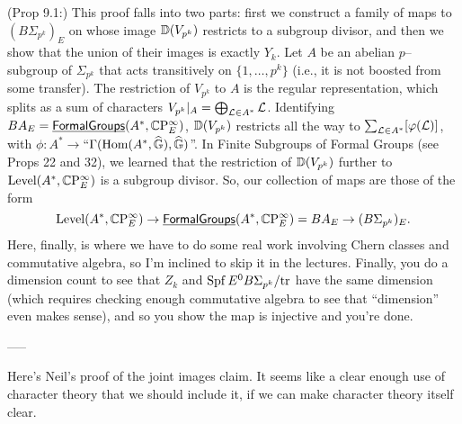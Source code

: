 (Prop 9.1:) This proof falls into two parts: first we construct a family of maps to $(B\Sigma_{p^k})_E$ on whose image $\mathbb D(V_{p^k})$ restricts to a subgroup divisor, and then we show that the union of their images is exactly $Y_k$.  Let $A$ be an abelian $p$--subgroup of $\Sigma_{p^k}$ that acts transitively on $\{1, \ldots, p^k\}$ (i.e., it is not boosted from some transfer).  The restriction of $V_{p^k}$ to $A$ is the regular representation, which splits as a sum of characters $V_{p^k}|_A = \bigoplus_{\mathcal{L} \in A^*} \mathcal{L}$.  Identifying $BA_E = \operatorname{\underline{\smash{\mathsf{FormalGroups}}}}(A^*, \mathbb{C}\mathrm P^\infty_E)$, $\mathbb D(V_{p^k})$ restricts all the way to $\sum_{\mathcal{L} \in A^*} [\varphi(\mathcal{L})]$, with $\phi: A^* \to $``$\Gamma(\operatorname{Hom}(A^*, \widehat{\mathbb G}), \widehat{\mathbb G})$''.  In Finite Subgroups of Formal Groups (see Props 22 and 32), we learned that the restriction of $\mathbb D(V_{p^k})$ further to $\operatorname{Level}(A^*, \mathbb{C}\mathrm P^\infty_E)$ is a subgroup divisor.  So, our collection of maps are those of the form \[\operatorname{Level}(A^*, \mathbb{C}\mathrm P^\infty_E) \to \operatorname{\underline{\smash{\mathsf{FormalGroups}}}}(A^*, \mathbb{C}\mathrm P^\infty_E) = BA_E \to (B\Sigma_{p^k})_E.\]  Here, finally, is where we have to do some real work involving Chern classes and commutative algebra, so I'm inclined to skip it in the lectures.  Finally, you do a dimension count to see that $Z_k$ and $\operatorname{Spf} E^0 B\Sigma_{p^k} / \mathrm{tr}$ have the same dimension (which requires checking enough commutative algebra to see that ``dimension'' even makes sense), and so you show the map is injective and you're done.


-----

Here's Neil's proof of the joint images claim.  It seems like a clear enough use of character theory that we should include it, if we can make character theory itself clear.

